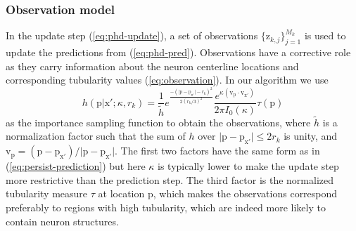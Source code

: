 \subsubsection{Observation model}
\label{sssec:observation-model}
In the update step (\ref{eq:phd-update}), a set of observations $\{\mathrm{z}_{k,j}\}_{j=1}^{M_k}$ is used to update the predictions from (\ref{eq:phd-pred}). Observations have a corrective role as they carry information about the neuron centerline locations and corresponding tubularity values (\ref{eq:observation}). In our algorithm we use
\begin{equation}
\label{eq:observation-importance-sampling}
h(\mathrm{p} | \mathrm{x'}; \kappa, r_k) = \frac{1}{\tilde{h}} e^{\frac{ -(\vert \mathrm{p} - \mathrm{p}_{\mathrm{x'}}  \vert - r_k)^2  }{2 (r_k/3)^2}} \frac{e^{\kappa (\mathrm{v}_{\mathrm{p}} \cdot \mathrm{v}_{\mathrm{x'}})}}{2 \pi I_0(\kappa)} \tau(\mathrm{p})
\end{equation}
as the importance sampling function to obtain the observations, where $\tilde{h}$ is a normalization factor such that the sum of $h$ over $\vert \mathrm{p} - \mathrm{p}_{\mathrm{x'}} \vert \leq 2r_k$ is unity, and $\mathrm{v}_{\mathrm{p}}=(\mathrm{p}-\mathrm{p}_{\mathrm{x'}})/\vert \mathrm{p}-\mathrm{p}_{\mathrm{x'}}\vert$. The first two factors have the same form as in (\ref{eq:persist-prediction}) but here $\kappa$ is typically lower to make the update step more restrictive than the prediction step. The third factor is the normalized tubularity measure $\tau$ \citep{Sato-1998} at location $\mathrm{p}$, which makes the observations correspond preferably to regions with high tubularity, which are indeed more likely to contain neuron structures.

